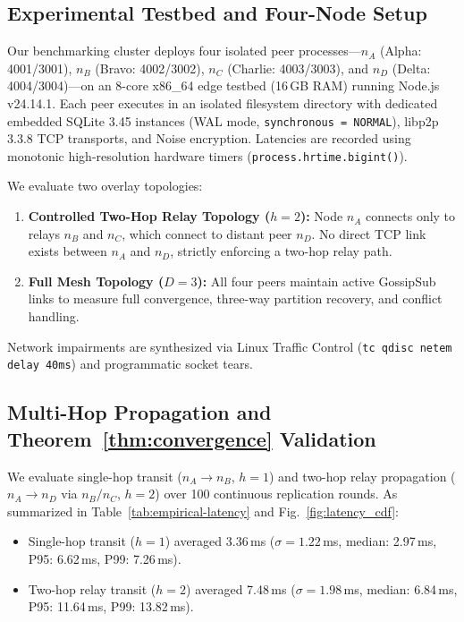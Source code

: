 \subsection{Experimental Testbed and Four-Node Setup}
\label{sec:eval-setup}

Our benchmarking cluster deploys four isolated peer processes---$n_A$ (Alpha: 4001/3001), $n_B$ (Bravo: 4002/3002), $n_C$ (Charlie: 4003/3003), and $n_D$ (Delta: 4004/3004)---on an 8-core x86\_64 edge testbed (16\,GB RAM) running Node.js v24.14.1. Each peer executes in an isolated filesystem directory with dedicated embedded SQLite 3.45 instances (WAL mode, \texttt{synchronous = NORMAL}), libp2p 3.3.8 TCP transports, and Noise encryption. Latencies are recorded using monotonic high-resolution hardware timers (\texttt{process.hrtime.bigint()}).

We evaluate two overlay topologies:
\begin{enumerate}
    \item \textbf{Controlled Two-Hop Relay Topology ($h=2$):} Node $n_A$ connects only to relays $n_B$ and $n_C$, which connect to distant peer $n_D$. No direct TCP link exists between $n_A$ and $n_D$, strictly enforcing a two-hop relay path.
    \item \textbf{Full Mesh Topology ($D=3$):} All four peers maintain active GossipSub links to measure full convergence, three-way partition recovery, and conflict handling.
\end{enumerate}
Network impairments are synthesized via Linux Traffic Control (\texttt{tc qdisc netem delay 40ms}) and programmatic socket tears.

\subsection{Multi-Hop Propagation and Theorem~\ref{thm:convergence} Validation}
\label{sec:eval-latency}

We evaluate single-hop transit ($n_A \to n_B$, $h=1$) and two-hop relay propagation ($n_A \to n_D$ via $n_B/n_C$, $h=2$) over 100 continuous replication rounds. As summarized in Table~\ref{tab:empirical-latency} and Fig.~\ref{fig:latency_cdf}:
\begin{itemize}
    \item Single-hop transit ($h=1$) averaged 3.36\,ms ($\sigma = 1.22$\,ms, median: 2.97\,ms, P95: 6.62\,ms, P99: 7.26\,ms).
    \item Two-hop relay transit ($h=2$) averaged 7.48\,ms ($\sigma = 1.98$\,ms, median: 6.84\,ms, P95: 11.64\,ms, P99: 13.82\,ms).
\end{itemize}

